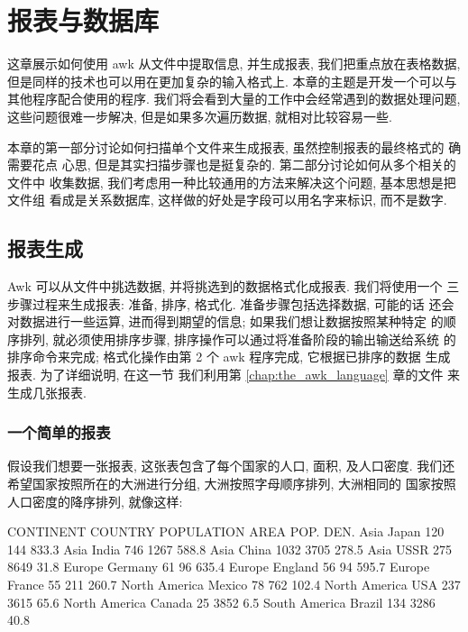 \chapter{报表与数据库}
\label{chap:reports_and_databases}

这章展示如何使用 awk 从文件中提取信息, 并生成报表, 我们把重点放在表格数据,
但是同样的技术也可以用在更加复杂的输入格式上. 本章的主题是开发一个可以与
其他程序配合使用的程序. 我们将会看到大量的工作中会经常遇到的数据处理问题,
这些问题很难一步解决, 但是如果多次遍历数据, 就相对比较容易一些.

本章的第一部分讨论如何扫描单个文件来生成报表, 虽然控制报表的最终格式的
确需要花点
心思, 但是其实扫描步骤也是挺复杂的. 第二部分讨论如何从多个相关的文件中
收集数据, 我们考虑用一种比较通用的方法来解决这个问题, 基本思想是把文件组
看成是关系数据库, 这样做的好处是字段可以用名字来标识, 而不是数字.

\section{报表生成}
\label{sec:generating_reports}

Awk 可以从文件中挑选数据, 并将挑选到的数据格式化成报表. 我们将使用一个
三步骤过程来生成报表: 准备, 排序, 格式化. 准备步骤包括选择数据, 可能的话
还会对数据进行一些运算, 进而得到期望的信息; 如果我们想让数据按照某种特定
的顺序排列, 就必须使用排序步骤, 排序操作可以通过将准备阶段的输出输送给系统
的排序命令来完成; 格式化操作由第 2 个 awk 程序完成, 它根据已排序的数据
生成报表. 为了详细说明, 在这一节 我们利用第 \ref{chap:the_awk_language} 
章的文件 来生成几张报表.

\subsection{一个简单的报表}
\label{subsec:a_simple_report}

假设我们想要一张报表, 这张表包含了每个国家的人口, 面积, 及人口密度.
我们还希望国家按照所在的大洲进行分组, 大洲按照字母顺序排列, 大洲相同的
国家按照人口密度的降序排列, 就像这样:
\begin{awkcode}
    CONTINENT       COUNTRY    POPULATION    AREA    POP. DEN.
    Asia            Japan          120        144      833.3
    Asia            India          746       1267      588.8
    Asia            China         1032       3705      278.5
    Asia            USSR           275       8649       31.8
    Europe          Germany         61         96      635.4
    Europe          England         56         94      595.7
    Europe          France          55        211      260.7
    North America   Mexico          78        762      102.4
    North America   USA            237       3615       65.6
    North America   Canada          25       3852        6.5
    South America   Brazil         134       3286       40.8
\end{awkcode}

